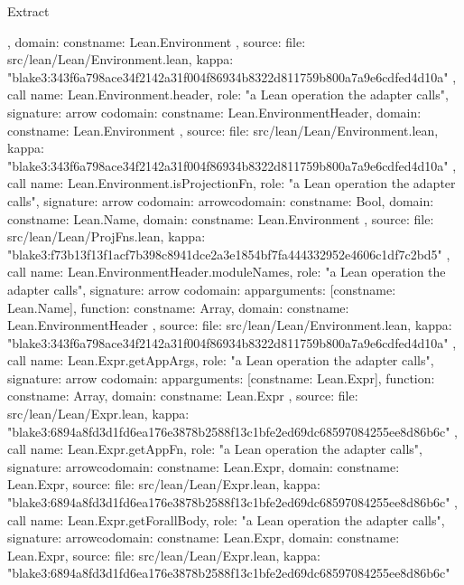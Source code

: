 \begin{lexlean}{Extract}
\begin{toolingmodule}
{{{{        },
        domain: const{name: Lean.Environment}
      },
      source: {
        file: src/lean/Lean/Environment.lean,
        kappa: "blake3:343f6a798ace34f2142a31f004f86934b8322d811759b800a7a9e6cdfed4d10a"
      }
    },
    call{
      name: Lean.Environment.header,
      role: "a Lean operation the adapter calls",
      signature: arrow{
        codomain: const{name: Lean.EnvironmentHeader},
        domain: const{name: Lean.Environment}
      },
      source: {
        file: src/lean/Lean/Environment.lean,
        kappa: "blake3:343f6a798ace34f2142a31f004f86934b8322d811759b800a7a9e6cdfed4d10a"
      }
    },
    call{
      name: Lean.Environment.isProjectionFn,
      role: "a Lean operation the adapter calls",
      signature: arrow{
        codomain: arrow{codomain: const{name: Bool}, domain: const{name: Lean.Name}},
        domain: const{name: Lean.Environment}
      },
      source: {
        file: src/lean/Lean/ProjFns.lean,
        kappa: "blake3:f73b13f13f1acf7b398c8941dce2a3e1854bf7fa444332952e4606c1df7c2bd5"
      }
    },
    call{
      name: Lean.EnvironmentHeader.moduleNames,
      role: "a Lean operation the adapter calls",
      signature: arrow{
        codomain: app{arguments: [const{name: Lean.Name}], function: const{name: Array}},
        domain: const{name: Lean.EnvironmentHeader}
      },
      source: {
        file: src/lean/Lean/Environment.lean,
        kappa: "blake3:343f6a798ace34f2142a31f004f86934b8322d811759b800a7a9e6cdfed4d10a"
      }
    },
    call{
      name: Lean.Expr.getAppArgs,
      role: "a Lean operation the adapter calls",
      signature: arrow{
        codomain: app{arguments: [const{name: Lean.Expr}], function: const{name: Array}},
        domain: const{name: Lean.Expr}
      },
      source: {
        file: src/lean/Lean/Expr.lean,
        kappa: "blake3:6894a8fd3d1fd6ea176e3878b2588f13c1bfe2ed69dc68597084255ee8d86b6c"
      }
    },
    call{
      name: Lean.Expr.getAppFn,
      role: "a Lean operation the adapter calls",
      signature: arrow{codomain: const{name: Lean.Expr}, domain: const{name: Lean.Expr}},
      source: {
        file: src/lean/Lean/Expr.lean,
        kappa: "blake3:6894a8fd3d1fd6ea176e3878b2588f13c1bfe2ed69dc68597084255ee8d86b6c"
      }
    },
    call{
      name: Lean.Expr.getForallBody,
      role: "a Lean operation the adapter calls",
      signature: arrow{codomain: const{name: Lean.Expr}, domain: const{name: Lean.Expr}},
      source: {
        file: src/lean/Lean/Expr.lean,
        kappa: "blake3:6894a8fd3d1fd6ea176e3878b2588f13c1bfe2ed69dc68597084255ee8d86b6c"
      }
}}
\end{toolingmodule}
\end{lexlean}
